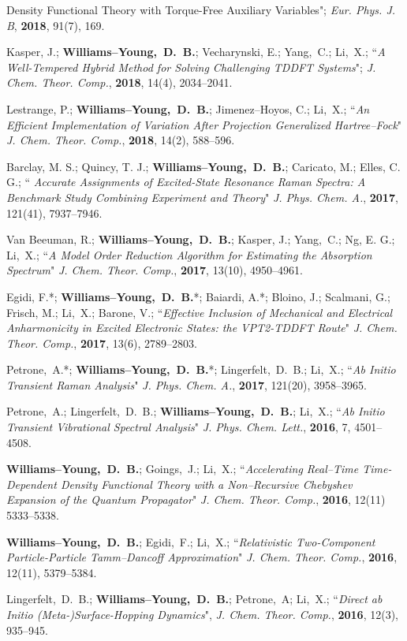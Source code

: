 \documentclass[10pt]{res} %
\newcommand*\me[0]{{\bf Williams--Young,~D.~B.}}
\newcommand*\xsli[0]{Li,~X.}
\newcommand*\cy[0]{Yang,~C.}
\begin{document}
\begin{resume}
\begin{etaremune}
{	  Density Functional Theory with Torque-Free Auxiliary Variables}";
	\emph{Eur. Phys. J. B}, \textbf{2018}, 91(7), 169.
  \item Kasper, J.; \me; Vecharynski, E.; \cy; \xsli;
        ``\emph{A Well-Tempered Hybrid Method for Solving Challenging 
	  TDDFT Systems}";
        \emph{J. Chem. Theor. Comp.}, \textbf{2018}, 14(4), 2034--2041.
  \item Lestrange, P.; \me; Jimenez--Hoyos, C.; \xsli;
        ``\emph{An Efficient Implementation of Variation After Projection 
	  Generalized Hartree--Fock}"
        \emph{J. Chem. Theor. Comp.}, \textbf{2018}, 14(2), 588--596.
  \item Barclay, M. S.; Quincy, T. J.; \me; Caricato, M.; Elles, C. G.;
        ``\emph{ Accurate Assignments of Excited-State Resonance Raman 
                 Spectra: A Benchmark Study Combining Experiment and 
                 Theory}"
        \emph{J. Phys. Chem. A.}, \textbf{2017}, 121(41), 7937--7946.
  \item Van Beeuman, R.; \me; Kasper, J.; \cy; Ng, E. G.; \xsli;
        ``\emph{A Model Order Reduction Algorithm for Estimating the 
	        Absorption Spectrum}"
        \emph{J. Chem. Theor. Comp.}, \textbf{2017}, 13(10), 4950--4961.
  \item Egidi, F.*; \me*; Baiardi, A.*; Bloino, J.; Scalmani, G.; Frisch, M.; 
        \xsli; Barone, V.; 
        ``\emph{Effective Inclusion of Mechanical and Electrical Anharmonicity in 
                Excited Electronic States: the VPT2-TDDFT Route}"
          \emph{J. Chem. Theor. Comp.}, \textbf{2017}, 13(6), 2789--2803.
  \item Petrone,~A.*; \me*; Lingerfelt,~D.~B.; \xsli;
        ``\emph{Ab Initio Transient Raman Analysis}"
	  \emph{J. Phys. Chem. A.}, \textbf{2017}, 121(20), 3958--3965.
  \item Petrone,~A.; Lingerfelt,~D.~B.; \me; \xsli;
        ``\emph{Ab Initio Transient Vibrational Spectral Analysis}"
	  \emph{J. Phys. Chem. Lett.}, \textbf{2016}, 7, 4501--4508.
  \item \me; Goings,~J.; \xsli;
	``\emph{Accelerating Real--Time Time-Dependent Density Functional Theory 
	        with a Non--Recursive Chebyshev Expansion of the Quantum 
                Propagator}"
	  \emph{J. Chem. Theor. Comp.}, \textbf{2016}, 12(11) 5333--5338.
  \item \me; Egidi,~F.; \xsli;
	``\emph{Relativistic Two-Component Particle-Particle Tamm--Dancoff 
	        Approximation}"
	  \emph{J. Chem. Theor. Comp.}, \textbf{2016}, 12(11), 5379--5384.
  \item Lingerfelt,~D.~B.; \me; Petrone,~A; \xsli; 
        ``\emph{Direct ab Initio (Meta-)Surface-Hopping Dynamics}", 
        \emph{J. Chem. Theor. Comp.}, \textbf{2016}, 12(3), 935--945.
\end{etaremune}
%


\end{resume}
\end{document}
